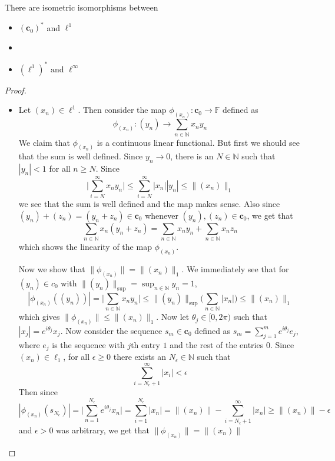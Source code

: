 \begin{theorem}
  There are isometric isomorphisms between \begin{itemize}[]
    \item $(\textbf{c}_0)^*$ and $\ell^1$
    \item 
    \item $(\ell^1)^{*} \textrm{ and } \ell^\infty$
  \end{itemize} 
\end{theorem}
\begin{proof}
  \begin{itemize}[]
    \item Let $(x_{n}) \in \ell^1$. Then consider the map $\phi_{(x_n)}: \textbf{c}_0 \to \mathbb{F}$ defined as $$\phi_{(x_n)}: (y_n) \to \sum_{n \in \mathbb{N}} x_ny_n$$
      We claim that $\phi_{(x_n)}$ is a continuous linear functional. But first we should see that the sum is well defined. Since $y_n \to 0$, there is an $N \in \mathbb{N}$ such that $|y_n| < 1$ for all $n \ge N$. Since \[
        \Big|\sum_{i = N}^{\infty} x_ny_n \Big| \le \sum_{i = N}^{\infty}  |x_n||y_n| \le \|(x_n)\|_1
      \]
      we see that the sum is well defined and the map makes sense. Also since $(y_n)+(z_n) = (y_n +z_n) \in \textbf{c}_0$ whenever $(y_n), (z_n) \in \textbf{c}_0$, we get that \[
        \sum_{n \in \mathbb{N}} x_n (y_n + z_n) = \sum_{n \in \mathbb{N}} x_n y_n + \sum_{n \in \mathbb{N}} x_n z_n
      \]
      which shows the linearity  of the map $\phi_{(x_n)}$.

      Now we show that $\|\phi_{(x_n)}\| = \|(x_n)\|_1$. We immediately see that for $(y_n) \in c_0$ with $\|(y_n)\|_{\textrm{sup}} = \sup_{n \in \mathbb{N}} y_n = 1$, \[
        |\phi_{(x_n)}((y_n))| = \Big|\sum_{n \in \mathbb{N}} x_ny_n \Big| \le \|(y_n)\|_{\textrm{sup}} \bigg( \sum_{n \in \mathbb{N}} |x_n| \bigg) \le \|(x_n)\|_1
       \]
      which gives $\|\phi_{(x_n)}\| \le \|(x_n)\|_1$. Now let $\theta_j \in [0, 2\pi)$ such that $|x_j| = e^{i \theta_j}x_j$. Now consider the sequence $s_m \in \textbf{c}_0$ defined as $s_m = \sum_{j = 1}^{m} e^{i \theta_j}e_j$, where $e_j$ is  the sequence with $j$th entry $1$ and the rest of the entries $0$. 
      Since $(x_n) \in \ell_1$, for all $\epsilon \ge 0$ there exists an $N_\epsilon \in \mathbb{N}$ such that \[
        \sum_{i = N_\epsilon+1}^{\infty} |x_i| < \epsilon
      \]
      Then since \[
        |\phi_{(x_n)}(s_{N_\epsilon})| = \Big| \sum_{n = 1}^{N_\epsilon} e^{i \theta_j}x_n \Big| = \sum_{i = 1}^{N_\epsilon} |x_n| = \|(x_n)\| - \sum_{i = N_\epsilon +1}^{\infty} |x_n| \ge \|(x_n)\| - \epsilon
      \]
      and $\epsilon > 0$ was arbitrary, we get that $\|\phi_{(x_n)}\| = \|(x_{n})\|$


\end{itemize}
\end{proof}
